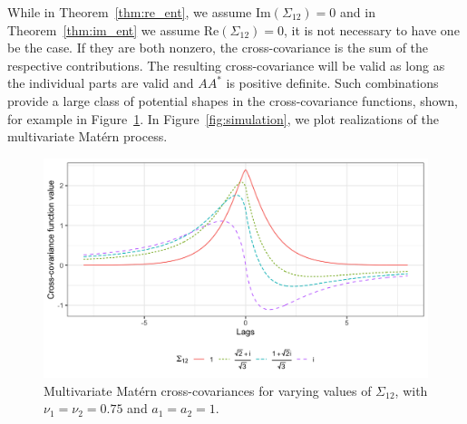 \documentclass[11pt]{article}
\begin{document}
While in Theorem~\ref{thm:re_ent}, we assume $\textrm{Im}(\Sigma_{12}) = 0$ and in Theorem~\ref{thm:im_ent} we assume $\textrm{Re}(\Sigma_{12}) = 0$, it is not necessary to have one be the case. If they are both nonzero, the cross-covariance is the sum of the respective contributions. The resulting cross-covariance will be valid as long as the individual parts are valid and $AA^*$ is positive definite. Such combinations provide a large class of potential shapes in the cross-covariance functions, shown, for example in Figure~\ref{fig:combo_ent}. In Figure~\ref{fig:simulation}, we plot realizations of the multivariate Mat\'ern process. 
\begin{figure}
\centering
\includegraphics[scale = .15]{../example_combination_function.png}
\caption{Multivariate Mat\'ern cross-covariances for varying values of $\Sigma_{12}$, with $\nu_1 = \nu_2 = 0.75$ and $a_1 = a_2 = 1$. }\label{fig:combo_ent}
\end{figure}
\end{document}
